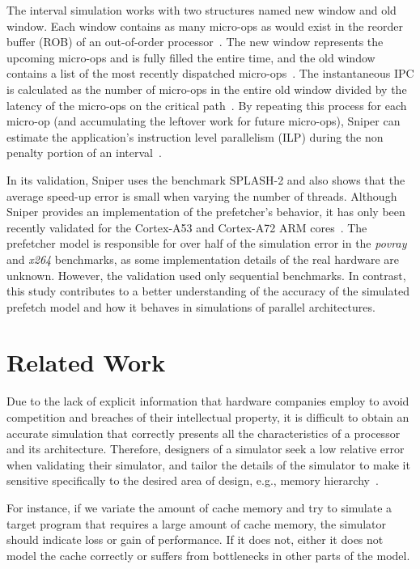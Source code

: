 \documentclass[AMA,final,STIX1COL]{WileyNJD-v2}
\begin{document}
The interval simulation works with two structures named new window and old window.
Each window contains as many micro-ops as would exist in the reorder buffer (ROB) of an out-of-order processor~\cite{carlson2014aeohmcm}.
The new window represents the upcoming micro-ops and is fully filled the entire time, and the old window contains a list of the most recently dispatched micro-ops~\cite{carlson2014aeohmcm}.
The instantaneous IPC is calculated as the number of micro-ops in the entire old window divided by the latency of the micro-ops on the critical path~\cite{carlson2014aeohmcm}.
By repeating this process for each micro-op (and accumulating the leftover work for future micro-ops), Sniper can estimate the application’s instruction level parallelism (ILP) during the non penalty portion of an interval~\cite{carlson2014aeohmcm}.

In its validation, Sniper uses the benchmark SPLASH-2\cite{woo1995splash} and also shows that the average speed-up error is small when varying the number of threads.
Although Sniper provides an implementation of the prefetcher's behavior, it has only been recently validated for the Cortex-A53 and Cortex-A72 ARM cores~\cite{adileh2019racing}.
The prefetcher model is responsible for over half of the simulation error in the \emph{povray} and \emph{x264} benchmarks, as some implementation details of the real hardware are unknown.
However, the validation used only sequential benchmarks.
In contrast, this study contributes to a better understanding of the accuracy of the simulated prefetch model and how it behaves in simulations of parallel architectures.


\section{Related Work}\label{sec:related}

Due to the lack of explicit information that hardware companies employ to avoid competition and breaches of their intellectual property, it is difficult to obtain an accurate simulation that correctly presents all the characteristics of a processor and its architecture. 
Therefore, designers of a simulator seek a low relative error when validating their simulator, and tailor the details of the simulator to make it sensitive specifically to the desired area of design, e.g., memory hierarchy~\cite{eeckhout2010computer}. 

For instance, if we variate the amount of cache memory and try to simulate a target program that requires a large amount of cache memory, the simulator should indicate loss or gain of performance. 
If it does not, either it does not model the cache correctly or suffers from bottlenecks in other parts of the model.
\end{document}
